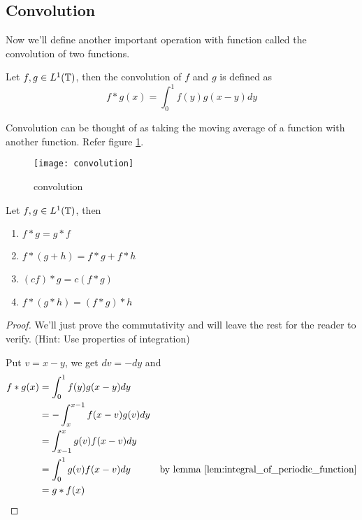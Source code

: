   \subsection{Convolution}
  Now we'll define another important operation with function called the convolution of two functions.
  \begin{definition}
    Let $f, g \in L^1(\mathbb T)$, then the convolution of $f$ and $g$ is defined as 
    \begin{displaymath}
      f*g(x) = \int_0^1 f(y)g(x-y)dy
    \end{displaymath}
  \end{definition}

  Convolution can be thought of as taking the moving average of a function with another function. Refer figure \ref{fig:convolution}.
  \begin{figure}
    \centering
    \texttt{[image: convolution]}
    \caption{convolution}
    \label{fig:convolution}
  \end{figure}

  \begin{proposition}
    \label{prop:properties_of_convolution}
    Let $f, g \in L^1(\mathbb T)$, then 
    \begin{enumerate}[label=(\alph*)]
      \item $f*g = g*f$
      \item $f*(g+h) = f*g +f*h$
      \item $(cf)*g = c(f*g)$
      \item $f*(g*h) = (f*g)*h$
    \end{enumerate}
  \end{proposition}
  \begin{proof}
    We'll just prove the commutativity and will leave the rest for the reader to verify. (Hint: Use properties of integration)

    Put $v = x-y$, we get $dv = -dy$ and 
    \begin{align*}
      f*g(x)  &= \int_{0}^{1}f(y)g(x-y) dy \\
              &= -\int_{x}^{x-1} f(x - v)g(v) dy\\
              &= \int_{x-1}^{x} g(v)f(x-v) dy \\
              &= \int_{0}^{1}g(v)f(x-v)dy  &\text{by lemma } \ref{lem:integral_of_periodic_function}\\
              &=g*f(x)
    \end{align*} 
  \end{proof}
  

